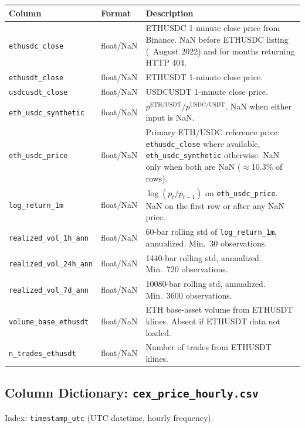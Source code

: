 \documentclass[11pt,a4paper]{article}
\begin{document}
\begin{xltabular}{\linewidth}{L{4.5cm}L{3.0cm}Y}
\toprule
\textbf{Column} & \textbf{Format} & \textbf{Description} \\
\midrule
\texttt{ethusdc\_close} & float/NaN & ETHUSDC 1-minute close price from
  Binance. NaN before ETHUSDC listing (~August 2022) and for months
  returning HTTP 404. \\
\texttt{ethusdt\_close} & float/NaN & ETHUSDT 1-minute close price. \\
\texttt{usdcusdt\_close} & float/NaN & USDCUSDT 1-minute close price. \\
\texttt{eth\_usdc\_synthetic} & float/NaN &
  $p^{\mathrm{ETH/USDT}} / p^{\mathrm{USDC/USDT}}$.
  NaN when either input is NaN. \\
\texttt{eth\_usdc\_price} & float/NaN & Primary ETH/USDC reference price:
  \texttt{ethusdc\_close} where available, \texttt{eth\_usdc\_synthetic}
  otherwise. NaN only when both are NaN ($\approx$10.3\% of rows). \\
\texttt{log\_return\_1m} & float/NaN & $\log(p_t / p_{t-1})$ on
  \texttt{eth\_usdc\_price}. NaN on the first row or after any NaN price. \\
\texttt{realized\_vol\_1h\_ann} & float/NaN & 60-bar rolling std of
  \texttt{log\_return\_1m}, annualized. Min.\ 30 observations. \\
\texttt{realized\_vol\_24h\_ann} & float/NaN & 1440-bar rolling std,
  annualized. Min.\ 720 observations. \\
\texttt{realized\_vol\_7d\_ann} & float/NaN & 10080-bar rolling std,
  annualized. Min.\ 3600 observations. \\
\texttt{volume\_base\_ethusdt} & float/NaN & ETH base-asset volume from
  ETHUSDT klines. Absent if ETHUSDT data not loaded. \\
\texttt{n\_trades\_ethusdt} & float/NaN & Number of trades from ETHUSDT
  klines. \\
\bottomrule
\end{xltabular}

\subsection{Column Dictionary: \texttt{cex\_price\_hourly.csv}}

Index: \texttt{timestamp\_utc} (UTC datetime, hourly frequency).
\end{document}
